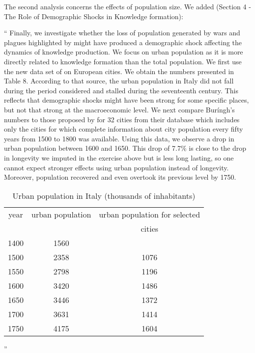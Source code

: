\documentclass[12pt]{article}
\begin{document}
The second analysis concerns the effects of population size. We added (Section 4  - The Role of Demographic Shocks in Knowledge formation):

``
Finally, we investigate whether the loss of population generated by wars and plagues highlighted by  might have produced a demographic shock affecting the dynamics of knowledge production. We focus on urban population as it is more directly related to knowledge formation than the total population.  We first use the new data set of  on European cities. We obtain the numbers presented in Table 8. According to that source, the urban population in Italy did not fall during the period considered and stalled during the seventeenth century. This reflects that demographic shocks might have been strong for some specific places, but not that strong at the macroeconomic level. We next compare Buríngh's numbers to those proposed by  for 32 cities from their  database which includes only the cities for which complete information about city population every fifty years from 1500 to 1800 was available. Using this data, we observe a drop in urban population between 1600 and 1650. This drop of 7.7\% is close to the drop in longevity we imputed in the exercise above but is less long lasting, so one cannot expect stronger effects using urban population instead of longevity. Moreover, population recovered and even overtook its previous level by 1750.

\setcounter{table}{6}

\begin{table}[htb]
\begin{center}
\begin{tabular}{ccc}
\hline\hline
year  &   urban population  & urban population for selected\\
& \cite{buringh2021population} & cities \cite{alfani2019plague}\\
\hline
1400	&	1560	&	                        \\
1500	&	2358	&	  1076                  \\
1550	&	2798	&	  1196                  \\
1600	&	3420	&	  1486                  \\
1650	&	3446	&	  1372                  \\
1700	&	3631	&	  1414                   \\
1750	&	4175     &   1604                   \\
\hline\hline
\end{tabular}
\end{center}
\caption{Urban population in Italy (thousands of inhabitants)}
\end{table}
''
\end{document}
